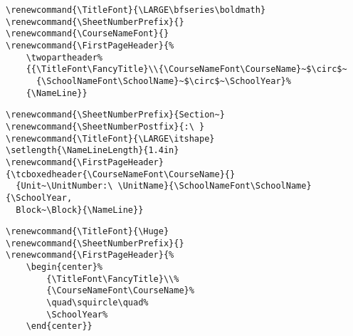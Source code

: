 \documentclass[12pt,twoside,parskip,notitle]{handout}
\begin{document}
\newpage

\begingroup
\renewcommand{\TitleFont}{\LARGE\bfseries\boldmath}
\renewcommand{\SheetNumberPrefix}{}
\renewcommand{\CourseNameFont}{}
\renewcommand{\FirstPageHeader}{%
	\twopartheader%
	{{\TitleFont\FancyTitle}\\{\CourseNameFont\CourseName}~$\circ$~{\SchoolNameFont\SchoolName}~$\circ$~\SchoolYear}%
	{\NameLine}}
\maketitle
\singlespacing
\begin{verbatim}
\renewcommand{\TitleFont}{\LARGE\bfseries\boldmath}
\renewcommand{\SheetNumberPrefix}{}
\renewcommand{\CourseNameFont}{}
\renewcommand{\FirstPageHeader}{%
    \twopartheader%
    {{\TitleFont\FancyTitle}\\{\CourseNameFont\CourseName}~$\circ$~
      {\SchoolNameFont\SchoolName}~$\circ$~\SchoolYear}%
    {\NameLine}}
\end{verbatim}
\endgroup
\newpage

\begingroup
\renewcommand{\SheetNumberPrefix}{Section~}
\renewcommand{\SheetNumberPostfix}{:\ }
\renewcommand{\TitleFont}{\LARGE\itshape}
\setlength{\NameLineLength}{1.4in}
\renewcommand{\FirstPageHeader}{\tcboxedheader{\CourseNameFont\CourseName}{}{Unit~\UnitNumber:\ \UnitName}{\SchoolNameFont\SchoolName}{\SchoolYear, Block~\Block}{\NameLine}}
\maketitle
\singlespacing
\begin{verbatim}
\renewcommand{\SheetNumberPrefix}{Section~}
\renewcommand{\SheetNumberPostfix}{:\ }
\renewcommand{\TitleFont}{\LARGE\itshape}
\setlength{\NameLineLength}{1.4in}
\renewcommand{\FirstPageHeader}{\tcboxedheader{\CourseNameFont\CourseName}{}
  {Unit~\UnitNumber:\ \UnitName}{\SchoolNameFont\SchoolName}{\SchoolYear, 
  Block~\Block}{\NameLine}}
\end{verbatim}
\endgroup

\newpage

\begingroup
\renewcommand{\TitleFont}{\Huge}
\renewcommand{\SheetNumberPrefix}{}
\renewcommand{\FirstPageHeader}{%
	\begin{center}%
		{\TitleFont\FancyTitle}\\%
		{\CourseNameFont\CourseName}%
		\quad\squircle\quad%
		\SchoolYear%
	\end{center}}
\maketitle
\begin{verbatim}
\renewcommand{\TitleFont}{\Huge}
\renewcommand{\SheetNumberPrefix}{}
\renewcommand{\FirstPageHeader}{%
    \begin{center}%
        {\TitleFont\FancyTitle}\\%
        {\CourseNameFont\CourseName}%
        \quad\squircle\quad%
        \SchoolYear%
    \end{center}}
\end{verbatim}
\endgroup
\end{document}
